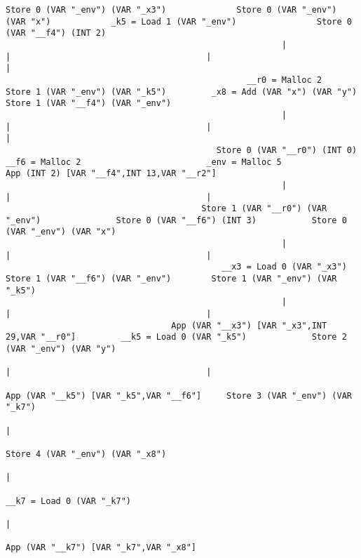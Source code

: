 \begin{landscape}
\begin{lstlisting}[basicstyle=\fontsize{6.5}{7.5}\selectfont\ttfamily]
                                        Store 0 (VAR "_env") (VAR "_x3")              Store 0 (VAR "_env") (VAR "x")            _k5 = Load 1 (VAR "_env")                Store 0 (VAR "__f4") (INT 2)
                                                       |                                            |                                       |                                         |
                                                __r0 = Malloc 2                      Store 1 (VAR "_env") (VAR "_k5")         _x8 = Add (VAR "x") (VAR "y")           Store 1 (VAR "__f4") (VAR "_env")
                                                       |                                            |                                       |                                         |
                                          Store 0 (VAR "__r0") (INT 0)                       __f6 = Malloc 2                         _env = Malloc 5              App (INT 2) [VAR "__f4",INT 13,VAR "__r2"]
                                                       |                                            |                                       |
                                       Store 1 (VAR "__r0") (VAR "_env")               Store 0 (VAR "__f6") (INT 3)           Store 0 (VAR "_env") (VAR "x")
                                                       |                                            |                                       |
                                           __x3 = Load 0 (VAR "_x3")                Store 1 (VAR "__f6") (VAR "_env")        Store 1 (VAR "_env") (VAR "_k5")
                                                       |                                            |                                       |
                                 App (VAR "__x3") [VAR "_x3",INT 29,VAR "__r0"]         __k5 = Load 0 (VAR "_k5")             Store 2 (VAR "_env") (VAR "y")
                                                                                                    |                                       |
                                                                                 App (VAR "__k5") [VAR "_k5",VAR "__f6"]     Store 3 (VAR "_env") (VAR "_k7")
                                                                                                                                            |
                                                                                                                             Store 4 (VAR "_env") (VAR "_x8")
                                                                                                                                            |
                                                                                                                                __k7 = Load 0 (VAR "_k7")
                                                                                                                                            |
                                                                                                                          App (VAR "__k7") [VAR "_k7",VAR "_x8"]

\end{lstlisting}
\end{landscape}
\clearpage